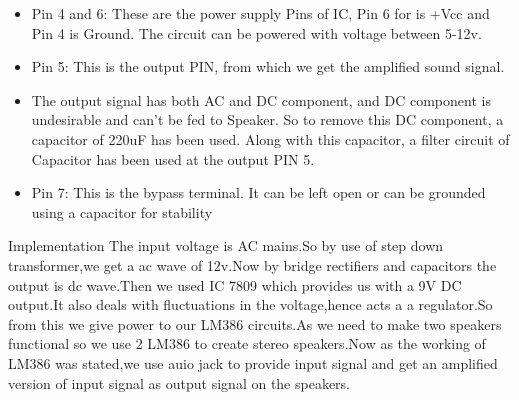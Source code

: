 \documentclass{beamer}
\begin{document}
\begin{frame}
\begin{itemize}
\item
Pin 4 and 6: These are the power supply Pins of IC, Pin 6 for is +Vcc and Pin 4 is Ground. The circuit can be powered with voltage between 5-12v.
\item
Pin 5: This is the output PIN, from which we get the amplified sound signal.
\item
The output signal has both AC and DC component, and DC component is undesirable and can’t be fed to Speaker. So to remove this DC component, a capacitor of 220uF has been used. 
Along with this capacitor, a filter circuit of Capacitor has been used at the output PIN 5.
\item
Pin 7: This is the bypass terminal. It can be left open or can be grounded using a capacitor for stability
\end{itemize}
\end{frame}
\begin{frame}{Implementation}
The input voltage is AC mains.So by use of step down transformer,we get a ac wave of 12v.Now by bridge rectifiers and capacitors the output is dc wave.Then we used IC 7809 which provides us with a 9V DC output.It also deals with fluctuations in the voltage,hence acts a a regulator.So from this we give power to our LM386 circuits.As we need to make two speakers functional so we use 2 LM386 to create stereo speakers.Now as the working of LM386 was stated,we use auio jack to provide input signal and get an amplified version of input signal as output signal on the speakers.   
    
\end{frame}
\end{document}
